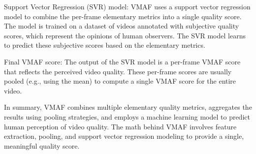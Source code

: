     Support Vector Regression (SVR) model: VMAF uses a support vector regression model to combine the per-frame elementary metrics into a single quality score. The model is trained on a dataset of videos annotated with subjective quality scores, which represent the opinions of human observers. The SVR model learns to predict these subjective scores based on the elementary metrics.

    Final VMAF score: The output of the SVR model is a per-frame VMAF score that reflects the perceived video quality. These per-frame scores are usually pooled (e.g., using the mean) to compute a single VMAF score for the entire video.

In summary, VMAF combines multiple elementary quality metrics, aggregates the results using pooling strategies, and employs a machine learning model to predict human perception of video quality. The math behind VMAF involves feature extraction, pooling, and support vector regression modeling to provide a single, meaningful quality score.



